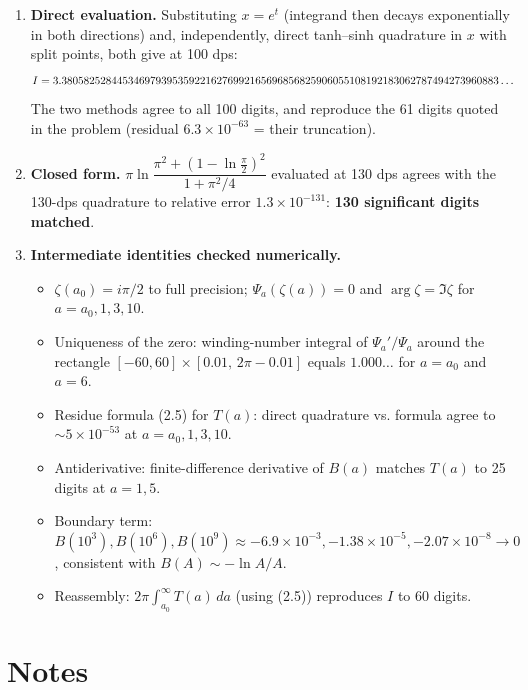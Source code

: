 \documentclass[11pt]{article}
\theoremstyle{remark}
\begin{document}
\begin{enumerate}
\item \textbf{Direct evaluation.} Substituting $x=e^{t}$ (integrand then decays exponentially in both directions) and, independently, direct tanh--sinh quadrature in $x$ with split points, both give at 100 dps:
\[\resizebox{\linewidth}{!}{$I=3.3805825284453469793953592216276992165696856825906055108192183062787494273960883\ldots$}\]
The two methods agree to all 100 digits, and reproduce the 61 digits quoted in the problem (residual $6.3\times10^{-63}$ = their truncation).
\item \textbf{Closed form.} $\pi\ln\dfrac{\pi^{2}+(1-\ln\frac\pi2)^{2}}{1+\pi^{2}/4}$ evaluated at 130 dps agrees with the 130-dps quadrature to relative error $1.3\times10^{-131}$: \textbf{130 significant digits matched}.
\item \textbf{Intermediate identities checked numerically.}
\begin{itemize}
\item $\zeta(a_0)=i\pi/2$ to full precision; $\Psi_a(\zeta(a))=0$ and $\arg\zeta=\Im\zeta$ for $a=a_0,1,3,10$.
\item Uniqueness of the zero: winding-number integral of $\Psi_a'/\Psi_a$ around the rectangle $[-60,60]\times[0.01,\,2\pi-0.01]$ equals $1.000\ldots$ for $a=a_0$ and $a=6$.
\item Residue formula (2.5) for $T(a)$: direct quadrature vs. formula agree to $\sim5\times10^{-53}$ at $a=a_0,1,3,10$.
\item Antiderivative: finite-difference derivative of $B(a)$ matches $T(a)$ to 25 digits at $a=1,5$.
\item Boundary term: $B(10^{3}),B(10^{6}),B(10^{9})\approx-6.9\times10^{-3},-1.38\times10^{-5},-2.07\times10^{-8}\to0$, consistent with $B(A)\sim-\ln A/A$.
\item Reassembly: $2\pi\int_{a_0}^{\infty}T(a)\,da$ (using (2.5)) reproduces $I$ to 60 digits.
\end{itemize}
\end{enumerate}

\section*{Notes}
\end{document}

